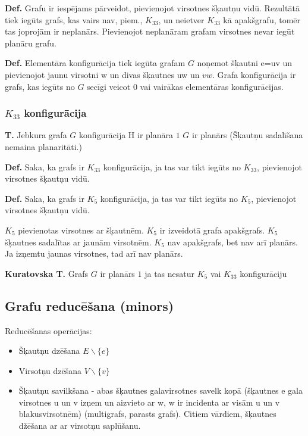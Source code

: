 \documentclass{article}
\begin{document}
\textbf{Def.} Grafu ir iespējams pārveidot, pievienojot virsotnes šķautņu vidū.  Rezultātā tiek iegūts grafs, kas vairs nav, piem., $K_{33}$, un neietver $K_{33}$ kā apakšgrafu, tomēr tas joprojām ir neplanārs.  Pievienojot neplanāram grafam virsotnes nevar iegūt planāru grafu.

\textbf{Def.}  Elementāra konfigurācija tiek iegūta grafam $ G $ noņemot šķautni e=uv un pievienojot jaunu virsotni w un divas šķautnes uw un $vw$.  Grafa konfigurācija ir grafs, kas iegūts no $ G $ secīgi veicot 0 vai vairākas elementāras konfigurācijas.

\subsubsection{$K_{33}$ konfigurācija}

\textbf{T.}  Jebkura grafa $ G $ konfigurācija H ir planāra $1$ $ G $ ir planārs (Šķautņu sadalīšana nemaina planaritāti.)

\textbf{Def.}  Saka, ka grafs ir $K_{33}$ konfigurācija, ja tas var tikt iegūts no $K_{33}$, pievienojot virsotnes šķautņu vidū.

\textbf{Def.}  Saka, ka grafs ir $K_5$ konfigurācija, ja tas var tikt iegūts no $K_5$, pievienojot virsotnes šķautņu vidū.

$K_5$ pievienotas virsotnes ar šķautnēm. $K_5$ ir izveidotā grafa apakšgrafs. $K_5$ šķautnes sadalītas ar jaunām virsotnēm. $K_5$ nav apakšgrafs, bet nav arī planārs. Ja izņemtu jaunas virsotnes, tad arī nav planārs.

\textbf{Kuratovska T.} Grafs $ G $ ir planārs $1$ ja tas nesatur $K_5$ vai $K_{33}$ konfigurāciju

\subsection{Grafu reducēšana (minors)}

Reducēšanas operācijas:
\begin{itemize}
	\item Šķautņu dzēšana $E \backslash \{e\}$
	\item Virsotņu dzēšana $V \backslash \{v\}$
	\item Šķautņu savilkšana - abas šķautnes galavirsotnes savelk kopā (šķautnes e gala virsotnes u un v izņem un aizvieto ar w, w ir incidenta ar visām u un v blakusvirsotnēm) (multigrafs, parasts grafs). Citiem vārdiem, šķautnes džēšana ar ar virsotņu saplūšanu.
\end{itemize}
\end{document}
